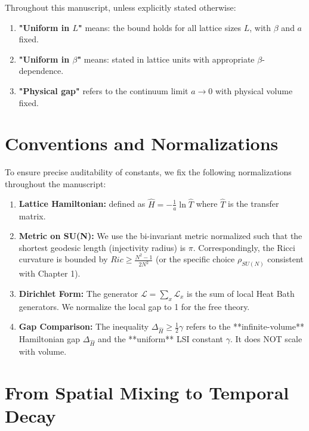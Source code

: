 \begin{definition}
\label{def:gap_convention}
Throughout this manuscript, unless explicitly stated otherwise:
\begin{enumerate}
    \item \textbf{"Uniform in $L$"} means: the bound holds for all lattice sizes $L$, with $\beta$ and $a$ fixed.
    \item \textbf{"Uniform in $\beta$"} means: stated in lattice units with appropriate $\beta$-dependence.
    \item \textbf{"Physical gap"} refers to the continuum limit $a \to 0$ with physical volume fixed.
\end{enumerate}
\end{definition}

\section{Conventions and Normalizations}
\label{sec:conventions_normalization}

To ensure precise auditability of constants, we fix the following normalizations throughout the manuscript:

\begin{enumerate}
    \item \textbf{Lattice Hamiltonian:} defined as $\hat{H} = -\frac{1}{a} \ln \hat{T}$ where $\hat{T}$ is the transfer matrix.
    \item \textbf{Metric on SU(N):} We use the bi-invariant metric normalized such that the shortest geodesic length (injectivity radius) is $\pi$. Correspondingly, the Ricci curvature is bounded by $Ric \ge \frac{N^2-1}{2 N^2}$ (or the specific choice $\rho_{SU(N)}$ consistent with Chapter 1).
    \item \textbf{Dirichlet Form:} The generator $\mathcal{L} = \sum_{x} \mathcal{L}_x$ is the sum of local Heat Bath generators. We normalize the local gap to 1 for the free theory.
    \item \textbf{Gap Comparison:} The inequality $\Delta_{\hat{H}} \ge \frac{1}{2} \gamma$ refers to the **infinite-volume** Hamiltonian gap $\Delta_{\hat{H}}$ and the **uniform** LSI constant $\gamma$. It does NOT scale with volume.
\end{enumerate}

\section{From Spatial Mixing to Temporal Decay}

